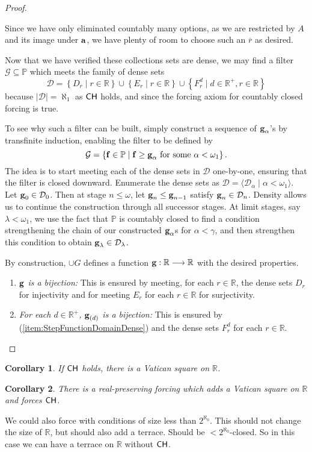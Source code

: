 \documentclass{amsart}
\newtheorem{corollary}{Corollary}
\theoremstyle{definition}
\theoremstyle{remark}
\renewcommand{\P}{\mathbb{P}}
\newcommand{\R}{\mathbb{R}}
\newcommand{\CH}{\textup{\textsf{CH}}}
\newcommand{\st}{\; | \;}
\newcommand{\set}[2]{\left\{#1\st #2 \right\}}
\newcommand{\seq}[2]{\langle #1 \st #2 \rangle}
\newcommand{\To}{\longrightarrow}
\renewcommand{\a}{\textup{\textbf{a}}}
\newcommand{\g}{\textup{\textbf{g}}}
\newcommand{\f}{\textup{\textbf{f}}}
\renewcommand{\r}{\overline r}
\begin{document}
\begin{proof}
\begin{enumerate}
Since we have only eliminated countably many options, as we are restricted by $A$ and its image under $\a$, we have plenty of room to choose such an $\r$ as desired.\\
\end{enumerate}

Now that we have verified these collections sets are dense, we may find a filter $\mathcal G\subseteq \P$ which meets the family of dense sets $$\mathcal D = \set{D_r}{r\in \R} \cup \set{E_r}{r \in \R} \cup \set{F^d_r}{d \in \R^+, r \in \R}$$ because $|\mathcal D|=\aleph_1$ as $\CH$ holds, and since the forcing axiom for countably closed forcing is true. 

To see why such a filter can be built, simply construct a sequence of $\g_\alpha$'s by transfinite induction, enabling the filter to be defined by 
	$$\mathcal G=\set{\f \in \P}{\f \geq \g_\alpha \text{ for some } \alpha<\omega_1}.$$ 
The idea is to start meeting each of the dense sets in $\mathcal D$ one-by-one, ensuring that the filter is closed downward. Enumerate the dense sets as $\mathcal D = \seq{\mathcal D_\alpha}{\alpha<\omega_1}$. Let $\g_0 \in \mathcal D_0$. Then at stage $n \leq \omega$, let $\g_n \leq \g_{n-1}$ satisfy $\g_n \in \mathcal D_n$. Density allows us to continue the construction through all successor stages. At limit stages, say $\lambda <\omega_1$, we use the fact that $\P$ is countably closed to find a condition strengthening the chain of our constructed $\g_\alpha$s for $\alpha<\gamma$, and then strengthen this condition to obtain $\g_\lambda \in \mathcal D_\lambda$.

By construction, $\cup G$ defines a function $\g: \R \To \R$ with the desired properties. 

\begin{enumerate}
	\item \emph{$\g$ is a bijection:} This is ensured by meeting, for each $r \in \R$, the dense sets $D_r$ for injectivity and for meeting $E_r$ for each $r \in \R$ for surjectivity.\\
	\item \emph{For each $d \in \R^+$, $\g_{(d)}$ is a bijection:} This is ensured by (\ref{item:StepFunctionDomainDense}) and the dense sets $F^d_r$ for each $r \in \R$. \qedhere
\end{enumerate}
\end{proof}
		
\begin{corollary} If $\CH$ holds, there is a Vatican square on $\R$. \end{corollary}
\begin{corollary} There is a real-preserving forcing which adds a Vatican square on $\R$ and forces $\CH$. \end{corollary}
We could also force with conditions of size less than $2^{\aleph_0}$. This should not change the size of $\R$, but should also add a terrace. Should be $<2^{\aleph_0}$-closed. So in this case we can have a terrace on $\R$ without $\CH$.
\end{document}
